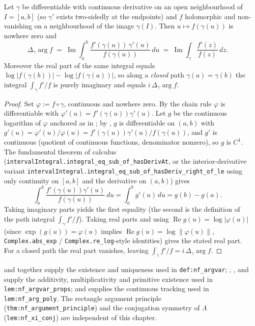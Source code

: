 \begin{lemma}
\label{lem:av_integral}
\leanok
{}
Let $\gamma$ be differentiable with continuous derivative on an open neighbourhood of
$I=[a,b]$ (so $\gamma'$ exists two-sidedly at the endpoints) and $f$ holomorphic and
non-vanishing on a neighbourhood of the image $\gamma(I)$. Then
$u\mapsto f(\gamma(u))$ is nowhere zero and
\[
  \Delta_\gamma\arg f
  \;=\; \operatorname{Im}\!\int_a^b \frac{f'(\gamma(u))\,\gamma'(u)}{f(\gamma(u))}\,du
  \;=\; \operatorname{Im}\!\int_\gamma \frac{f'(z)}{f(z)}\,dz .
\]
Moreover the real part of the same integral equals
$\log|f(\gamma(b))|-\log|f(\gamma(a))|$, so along a \emph{closed} path
$\gamma(a)=\gamma(b)$ the integral $\int_\gamma f'/f$ is purely imaginary and
equals $i\,\Delta_\gamma\arg f$.
\end{lemma}

\begin{proof}
\leanok
{}
Set $\varphi:=f\circ\gamma$, continuous and nowhere zero. By the chain rule
$\varphi$ is differentiable with $\varphi'(u)=f'(\gamma(u))\gamma'(u)$. Let $g$ be
the continuous logarithm of $\varphi$ anchored as in ;
by , $g$ is differentiable on $(a,b)$ with
$g'(u)=\varphi'(u)/\varphi(u)=f'(\gamma(u))\gamma'(u)/f(\gamma(u))$, and $g'$ is
continuous (quotient of continuous functions, denominator nonzero), so $g$ is
$C^1$. The fundamental theorem of calculus
(\texttt{intervalIntegral.integral\_eq\_sub\_of\_hasDerivAt}, or the
interior-derivative variant
\texttt{intervalIntegral.integral\_eq\_sub\_of\_hasDeriv\_right\_of\_le} using only
continuity on $[a,b]$ and the derivative on $(a,b)$) gives
\[
  \int_a^b \frac{f'(\gamma(u))\gamma'(u)}{f(\gamma(u))}\,du
  = \int_a^b g'(u)\,du = g(b)-g(a).
\]
Taking imaginary parts yields the first equality (the second is the definition of
the path integral $\int_\gamma f'/f$). Taking real parts and using
$\operatorname{Re} g(u)=\log|\varphi(u)|$ (since $\exp(g(u))=\varphi(u)$ implies
$\operatorname{Re} g(u)=\log\|\varphi(u)\|$, \texttt{Complex.abs\_exp} /
\texttt{Complex.re\_log}-style identities) gives the stated real part. For a
closed path the real part vanishes, leaving $\int_\gamma f'/f = i\,
\Delta_\gamma\arg f$.
\end{proof}

\begin{remark}
\label{rem:av_scope}
 and  together supply the existence and uniqueness
used in \texttt{def:nf\_argvar};
, ,  and  supply the
additivity, multiplicativity and primitive existence used in
\texttt{lem:nf\_argvar\_props}; and  supplies the
continuous tracking used in \texttt{lem:nf\_arg\_poly}. The rectangle argument
principle (\texttt{thm:nf\_argument\_principle}) and the conjugation symmetry of
$\Lambda$ (\texttt{lem:nf\_xi\_conj}) are independent of this chapter.
\end{remark}
